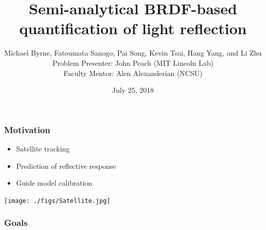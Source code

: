 \documentclass{beamer}
\title[Light reflections]{Semi-analytical BRDF-based quantification of light reflection}
\date{July 25, 2018}
\author[Byrne,Sanogo,Song,Tsai,Yang,Zhu]{
Michael Byrne, 
Fatoumata Sanogo,
Pai Song,
Kevin Tsai,
Hang Yang, and
Li Zhu\\
\medskip
Problem Presenter:  John Peach (MIT Lincoln Lab)\\
Faculty Mentor: Alen Alexanderian (NCSU)
}
\institute{IMSM}
\begin{document}
\begin{frame}
\titlepage
\end{frame}

\begin{frame}[t] 
\frametitle{Motivation} 
\begin{itemize} 
\item Satellite tracking 
\item Prediction of reflective response 
\item Guide model calibration 
\vspace{2mm}
\end{itemize} 
\centerline{\texttt{[image: ./figs/Satellite.jpg]}} 
\end{frame} 
 
\begin{frame}[t]
\frametitle{Goals} 


\end{frame}
\end{document}
